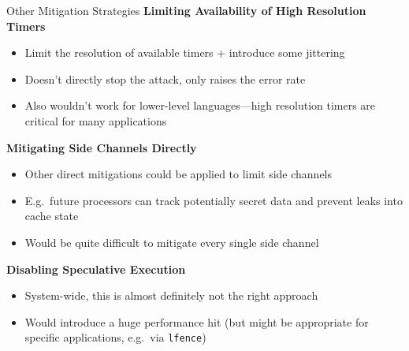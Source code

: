 \documentclass[10pt, dvipsnames, aspectratio=169]{beamer}
\begin{document}
\begin{frame}[c]{Other Mitigation Strategies}{}
  {\bf Limiting Availability of High Resolution Timers}
  \begin{itemize}
    \item Limit the resolution of available timers + introduce some jittering
    \item Doesn't directly stop the attack, only raises the error rate
    \item Also wouldn't work for lower-level languages---high resolution timers are critical for many applications
  \end{itemize}

  \vfill
  {\bf Mitigating Side Channels Directly}
  \begin{itemize}
    \item Other direct mitigations could be applied to limit side channels
    \item E.g.~future processors can track potentially secret data and prevent leaks into cache state
    \item Would be quite difficult to mitigate every single side channel
  \end{itemize}

  \vfill
  {\bf Disabling Speculative Execution}
  \begin{itemize}
    \item System-wide, this is almost definitely not the right approach
    \item Would introduce a huge performance hit (but might be appropriate for specific applications, e.g.~via {\tt lfence})
  \end{itemize}
\end{frame}
\end{document}
